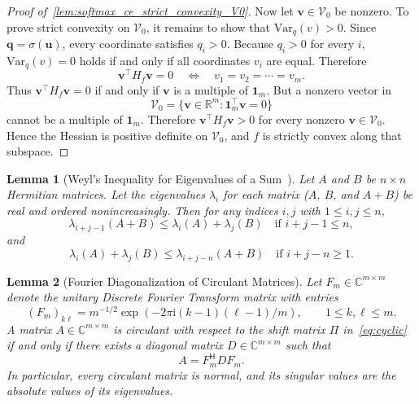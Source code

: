 \documentclass[11pt]{article}
\newtheorem{lemma}{Lemma}
\begin{document}
\begin{proof}[Proof of~\cref{lem:softmax_ce_strict_convexity_V0}]
Now let \(\boldsymbol{v}\in \mathcal V_0\) be nonzero. To prove strict convexity on \(\mathcal V_0\), it remains to show that \(\mathrm{Var}_q(v) > 0\). Since \(\boldsymbol{q} = \sigma(\boldsymbol{u})\), every coordinate satisfies \(q_i > 0\). Because \(q_i>0\) for every \(i\), \(\mathrm{Var}_q(v)=0\) holds if and only if all coordinates \(v_i\) are equal. Therefore
\[ \boldsymbol{v}^\top H_f \boldsymbol{v} = 0 \quad \iff \quad v_1 = v_2 = \cdots = v_m. \]
Thus \(\boldsymbol{v}^\top H_f \boldsymbol{v} = 0\) if and only if \(\boldsymbol{v}\) is a multiple of \(\boldsymbol{1}_m\). But a nonzero vector in
\[
\mathcal V_0 = \{\boldsymbol{v} \in \mathbb{R}^m : \boldsymbol{1}_m^\top \boldsymbol{v} = 0\}
\]
cannot be a multiple of \(\boldsymbol{1}_m\). Therefore \(\boldsymbol{v}^\top H_f \boldsymbol{v} > 0\) for every nonzero \(\boldsymbol{v} \in \mathcal V_0\). Hence the Hessian is positive definite on \(\mathcal V_0\), and \(f\) is strictly convex along that subspace.
\end{proof}

\begin{lemma}[Weyl's Inequality for Eigenvalues of a Sum~\citep{horn2012matrix}]
\label{lem:weyl_inequality}
Let \(A\) and \(B\) be \(n \times n\) Hermitian matrices. Let the eigenvalues $\lambda_i$ for each matrix (\(A\), \(B\), and \(A+B\)) be real and ordered nonincreasingly.
Then for any indices \(i,j\) with \(1\le i,j\le n\),
\[
\lambda_{i+j-1}(A+B)\le \lambda_i(A)+\lambda_j(B)\quad \text{if } i+j-1\le n,
\]
and
\[
\lambda_i(A)+\lambda_j(B)\le \lambda_{i+j-n}(A+B)\quad \text{if } i+j-n\ge 1.
\]
\end{lemma}

\begin{lemma}[Fourier Diagonalization of Circulant Matrices]
\label{lem:fourier_diagonalization_circulant}
Let \(F_m\in\mathbb C^{m\times m}\) denote the unitary Discrete Fourier Transform matrix with entries
\[
(F_m)_{k\ell}=m^{-1/2}\exp(-2\pi \mathrm{i}(k-1)(\ell-1)/m),
\qquad 1\le k,\ell\le m.
\]
A matrix \(A\in\mathbb C^{m\times m}\) is circulant with respect to the shift matrix \(\Pi\) in~\cref{eq:cyclic} if and only if there exists a diagonal matrix \(D\in\mathbb C^{m\times m}\) such that
\[
A=F_m^{\mathsf{H}}DF_m.
\]
In particular, every circulant matrix is normal, and its singular values are the absolute values of its eigenvalues.
\end{lemma}
\end{document}
